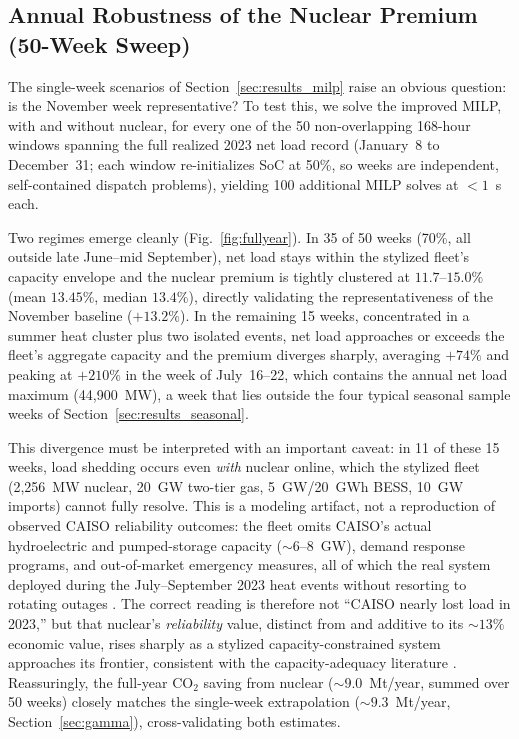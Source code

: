 \documentclass[preprint,12pt,authoryear]{elsarticle}
\begin{document}
\subsection{Annual Robustness of the Nuclear Premium (50-Week Sweep)}
\label{sec:fullyear}

The single-week scenarios of Section~\ref{sec:results_milp} raise an obvious question: is the November week representative? To test this, we solve the improved MILP, with and without nuclear, for every one of the 50 non-overlapping 168-hour windows spanning the full realized 2023 net load record (January~8 to December~31; each window re-initializes SoC at 50\%, so weeks are independent, self-contained dispatch problems), yielding 100 additional MILP solves at $< 1$~s each.

Two regimes emerge cleanly (Fig.~\ref{fig:fullyear}). In 35 of 50 weeks (70\%, all outside late June--mid September), net load stays within the stylized fleet's capacity envelope and the nuclear premium is tightly clustered at $11.7$--$15.0\%$ (mean $13.45\%$, median $13.4\%$), directly validating the representativeness of the November baseline ($+13.2\%$). In the remaining 15 weeks, concentrated in a summer heat cluster plus two isolated events, net load approaches or exceeds the fleet's aggregate capacity and the premium diverges sharply, averaging $+74\%$ and peaking at $+210\%$ in the week of July~16--22, which contains the annual net load maximum (44{,}900~MW), a week that lies outside the four typical seasonal sample weeks of Section~\ref{sec:results_seasonal}.

This divergence must be interpreted with an important caveat: in 11 of these 15 weeks, load shedding occurs even \emph{with} nuclear online, which the stylized fleet (2{,}256~MW nuclear, 20~GW two-tier gas, 5~GW/20~GWh BESS, 10~GW imports) cannot fully resolve. This is a modeling artifact, not a reproduction of observed CAISO reliability outcomes: the fleet omits CAISO's actual hydroelectric and pumped-storage capacity (${\sim}6$--$8$~GW), demand response programs, and out-of-market emergency measures, all of which the real system deployed during the July--September 2023 heat events without resorting to rotating outages \citep{caiso2023}. The correct reading is therefore not ``CAISO nearly lost load in 2023,'' but that nuclear's \emph{reliability} value, distinct from and additive to its ${\sim}13\%$ economic value, rises sharply as a stylized capacity-constrained system approaches its frontier, consistent with the capacity-adequacy literature \citep{sepulveda2018}. Reassuringly, the full-year CO$_2$ saving from nuclear (${\sim}9.0$~Mt/year, summed over 50 weeks) closely matches the single-week extrapolation (${\sim}9.3$~Mt/year, Section~\ref{sec:gamma}), cross-validating both estimates.
\end{document}
